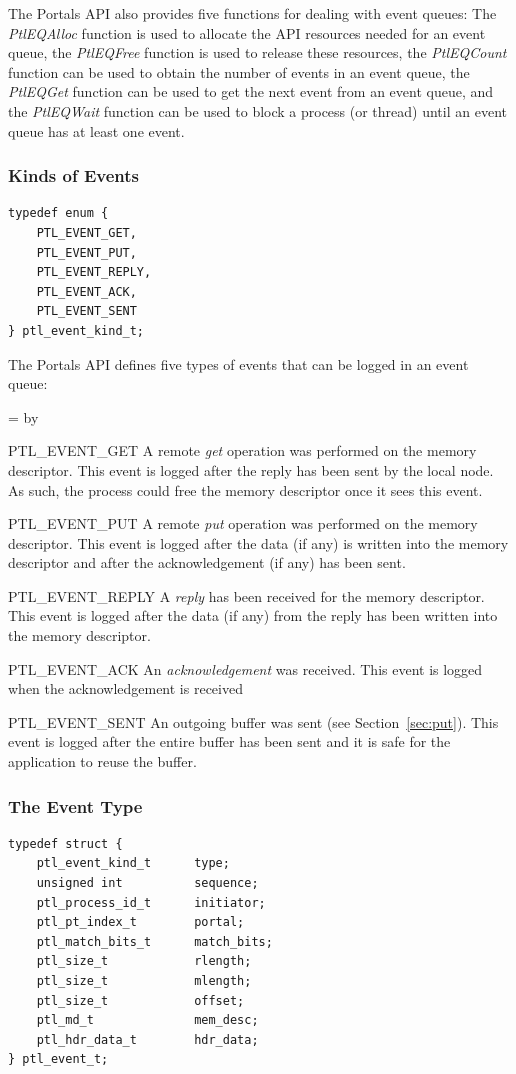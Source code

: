 \documentclass{sand-report}
\newcommand{\retlabel}[1]{\mbox{\texttt{#1}}\hfil}
\newenvironment{returns}%
  {\begin{list}{}%
      {\renewcommand{\makelabel}{\retlabel}%
        \topsep=0.0pt%
        \labelwidth=1.25in%
        \leftmargin=\labelwidth%
        \advance \leftmargin by \labelsep%
        \setlength{\itemsep}{.5\smallskipamount}%
        \setlength{\parsep}{0pt}}%
      }%
  {\end{list}}
\begin{document}
The Portals API also provides five functions for dealing with event
queues: The \emph{PtlEQAlloc} function is used to allocate the API
resources needed for an event queue, the \emph{PtlEQFree} function is
used to release these resources, the \emph{PtlEQCount} function can be
used to obtain the number of events in an event queue, the
\emph{PtlEQGet} function can be used to get the next event from an
event queue, and the \emph{PtlEQWait} function can be used to block a
process (or thread) until an event queue has at least one event.

\subsubsection{Kinds of Events}\label{sec:ek-type}
\begin{verbatim}
typedef enum { 
    PTL_EVENT_GET,
    PTL_EVENT_PUT,
    PTL_EVENT_REPLY,
    PTL_EVENT_ACK,
    PTL_EVENT_SENT
} ptl_event_kind_t;
\end{verbatim}

\noindent
The Portals API defines five types of events that can be logged in an
event queue:
\begin{returns}
\item[PTL_EVENT_GET] A remote \emph{get} operation was performed on
  the memory descriptor.  This event is logged after the reply has
  been sent by the local node.  As such, the process could free the
  memory descriptor once it sees this event.
\item[PTL_EVENT_PUT] A remote \emph{put} operation was performed on
  the memory descriptor.  This event is logged after the data (if any)
  is written into the memory descriptor and after the acknowledgement
  (if any) has been sent.
\item[PTL_EVENT_REPLY] A \emph{reply} has been received for the memory
  descriptor.  This event is logged after the data (if any) from the
  reply has been written into the memory descriptor.
\item[PTL_EVENT_ACK] An \emph{acknowledgement} was received.  This
  event is logged when the acknowledgement is received
\item[PTL_EVENT_SENT] An outgoing buffer was sent (see
  Section~\ref{sec:put}).  This event is logged after the entire
  buffer has been sent and it is safe for the application to reuse the
  buffer.
\end{returns}

\subsubsection{The Event Type}\label{sec:event-type}
\begin{verbatim}
typedef struct {
    ptl_event_kind_t      type;
    unsigned int          sequence;
    ptl_process_id_t      initiator;
    ptl_pt_index_t        portal;
    ptl_match_bits_t      match_bits;
    ptl_size_t            rlength;
    ptl_size_t            mlength;
    ptl_size_t            offset;
    ptl_md_t              mem_desc;
    ptl_hdr_data_t        hdr_data;
} ptl_event_t;
\end{verbatim}
\end{document}
